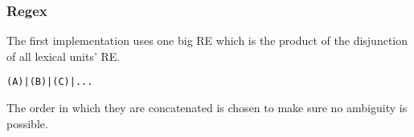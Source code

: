 \subsubsection{Regex}

The first implementation uses one big RE which is the product of the disjunction of all lexical units' RE.

\begin{verbatim}
(A)|(B)|(C)|...

\end{verbatim}

The order in which they are concatenated is chosen to make sure no ambiguity is possible.



